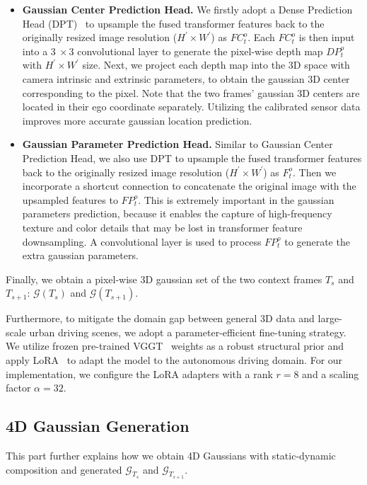 \begin{itemize}[leftmargin=9pt]
    \item \textbf{Gaussian Center Prediction Head.} We firstly adopt a Dense Prediction Head (DPT)~\cite{ranftl2021vision} to upsample the fused transformer features back to the originally resized image resolution ($H^{'}\times W^{'}$) as $FC_{t}^{o}$. Each $FC_{t}^{o}$ is then input into a $3~\times 3$ convolutional layer to generate the pixel-wise depth map $DP_t^{o}$ with $H^{'}\times W^{'}$ size. Next, we project each depth map into the 3D space with camera intrinsic and extrinsic parameters, to obtain the gaussian 3D center corresponding to the pixel. Note that the two frames' gaussian 3D centers are located in their ego coordinate separately. Utilizing the calibrated sensor data improves more accurate gaussian location prediction.

    \item \textbf{Gaussian Parameter Prediction Head.} Similar to Gaussian Center Prediction Head, we also use DPT to upsample the fused transformer features back to the originally resized image resolution ($H^{'}\times W^{'}$) as $F_{t}^{o}$. Then we incorporate a shortcut connection to concatenate the original image with the upsampled features to $FP_{t}^{o}$. This is extremely important in the gaussian parameters prediction, because it enables the capture of high-frequency texture and color details that may be lost in transformer feature downsampling. A convolutional layer is used to process $FP_{t}^{o}$ to generate the extra gaussian parameters.
\end{itemize}

Finally, we obtain a pixel-wise 3D gaussian set of the two context frames $T_s$ and $T_{s+1}$: $\mathcal{G}(T_s)$ and $\mathcal{G}(T_{s+1})$.

Furthermore, to mitigate the domain gap between general 3D data and large-scale urban driving scenes, we adopt a parameter-efficient fine-tuning strategy. We utilize frozen pre-trained VGGT~\cite{wang2025vggt} weights as a robust structural prior and apply LoRA~\cite{hu2022lora} to adapt the model to the autonomous driving domain. For our implementation, we configure the LoRA adapters with a rank $r=8$ and a scaling factor $\alpha=32$.


\subsection{4D Gaussian Generation}
\label{sec:method-4dgs}
This part further explains how we obtain 4D Gaussians with static-dynamic composition and generated $ \mathcal{G}_{T_{s}}$ and $ \mathcal{G}_{T_{s+1}}$.


